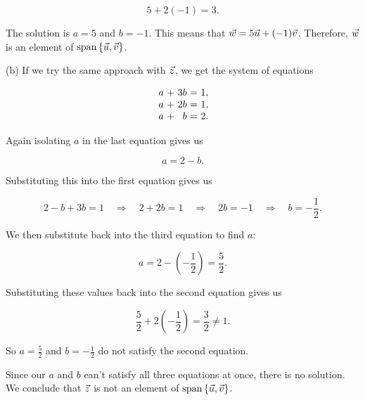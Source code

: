 \documentclass{ximera}
\begin{document}
\begin{exploration}
\begin{example}
\begin{solution}
    \begin{equation*}
      5 + 2(-1) = 3.
    \end{equation*}
  
    The solution is $a=5$ and $b=-1$. This means that
    $\vec{w} = 5\vec{u} + (-1)\vec{v}$. Therefore, $\vec{w}$ is an
    element of $\text{span}\left\{\vec{u},\vec{v}\right\}$.
  
    (b) If we try the same approach with $\vec{z}$, we get the system of equations
  
    \begin{equation*}
      \begin{array}{r@{~}c@{~}r@{~}c@{~}r@{~}r}
        a & + & 3b & = & 1, \\
        a & + & 2b & = & 1, \\
        a & + & b & = & 2.
      \end{array}
    \end{equation*}

    Again isolating $a$ in the last equation gives us

    \begin{equation*}
      a = 2 - b.
    \end{equation*}

    Substituting this into the first equation gives us

    \begin{equation*}
      2 - b + 3b = 1 \quad \Rightarrow \quad 2 + 2b = 1 \quad \Rightarrow \quad 2b = -1 \quad \Rightarrow \quad b = -\frac{1}{2}.
    \end{equation*}

    We then substitute back into the third equation to find $a$:

    \begin{equation*}
      a = 2 - \left(-\frac{1}{2}\right) = \frac{5}{2}.
    \end{equation*}

    Substituting these values back into the second equation gives us

    \begin{equation*}
      \frac{5}{2} + 2\left(-\frac{1}{2}\right) = \frac{3}{2}\neq 1.
    \end{equation*}

    So $a=\frac{5}{2}$ and $b=-\frac{1}{2}$ do not satisfy the second equation.

    Since our $a$ and $b$ can't satisfy all three equations at once, there is no solution. We conclude
    that $\vec{z}$ is not an element of
    $\text{span}\left\{\vec{u},\vec{v}\right\}$.
  \end{solution}


\end{example}
\end{exploration}
\end{document}
